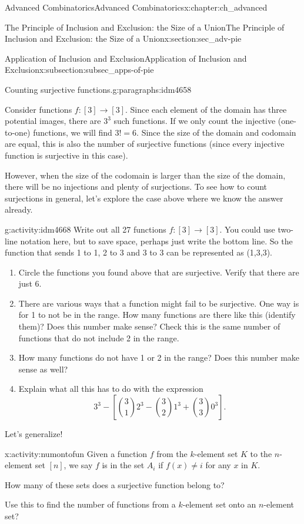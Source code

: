 \documentclass[oneside,10pt,]{book}
\numberwithin{equation}{chapter}
\begin{document}
\begin{chapterptx}{Advanced Combinatorics}{}{Advanced Combinatorics}{}{}{x:chapter:ch_advanced}
\begin{sectionptx}{The Principle of Inclusion and Exclusion: the Size of a Union}{}{The Principle of Inclusion and Exclusion: the Size of a Union}{}{}{x:section:sec_adv-pie}
\begin{subsectionptx}{Application of Inclusion and Exclusion}{}{Application of Inclusion and Exclusion}{}{}{x:subsection:subsec_apps-of-pie}
\begin{paragraphs}{Counting surjective functions.}{g:paragraphs:idm4658}
\par
Consider functions \(f:[3]\to [3]\).  Since each element of the domain has three potential images, there are \(3^3\) such functions.  If we only count the injective (one-to-one) functions, we will find \(3! = 6\).  Since the size of the domain and codomain are equal, this is also the number of surjective functions (since every injective function is surjective in this case).%
\par
However, when the size of the codomain is larger than the size of the domain, there will be no injections and plenty of surjections.  To see how to count surjections in general, let's explore the case above where we know the answer already.%
\begin{activity}{}{g:activity:idm4668}%
Write out all 27 functions \(f:[3] \to [3]\).  You could use two-line notation here, but to save space, perhaps just write the bottom line.  So the function that sends 1 to 1, 2 to 3 and 3 to 3 can be represented as (1,3,3).\begin{enumerate}[font=\bfseries,label=(\alph*),ref=\alph*]
\item{}Circle the functions you found above that are surjective.  Verify that there are just 6.%
\item{}There are various ways that a function might fail to be surjective.  One way is for 1 to not be in the range.  How many functions are there like this (identify them)?  Does this number make sense?  Check this is the same number of functions that do not include 2 in the range.%
\item{}How many functions do not have 1 or 2 in the range?  Does this number make sense as well?%
\item{}Explain what all this has to do with the expression%
\begin{equation*}
3^3 - \left[ \binom{3}{1}2^3 - \binom{3}{2}1^3 + \binom{3}{3}0^3\right]\text{.}
\end{equation*}
%
\end{enumerate}
\end{activity}
Let's generalize!%
\begin{activity}{}{x:activity:numontofun}%
Given a function \(f\) from the \(k\)-element set \(K\) to the \(n\)-element set \([n]\), we say \(f\) is in the set \(A_i\) if \(f(x)\not= i\) for any \(x\) in \(K\).%
\par
How many of these sets does a surjective function belong to?%
\par
Use this to find the number of functions from a \(k\)-element set onto an \(n\)-element set?%

\end{activity}
\end{paragraphs}
\end{subsectionptx}
\end{sectionptx}
\end{chapterptx}
\end{document}
